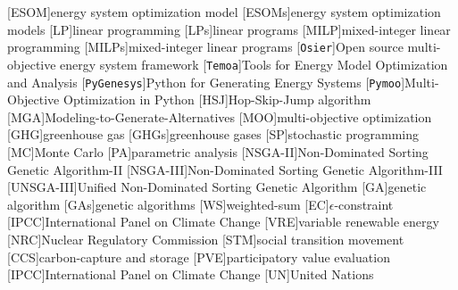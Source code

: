 [ESOM]{energy system optimization model}
[ESOMs]{energy system optimization models}
[LP]{linear programming}
[LPs]{linear programs}
[MILP]{mixed-integer linear programming}
[MILPs]{mixed-integer linear programs}
[\texttt{Osier}]{Open source multi-objective energy system framework}
[\texttt{Temoa}]{Tools for Energy Model Optimization and Analysis}
[\texttt{PyGenesys}]{Python for Generating Energy Systems}
[\texttt{Pymoo}]{Multi-Objective Optimization in Python}
[HSJ]{Hop-Skip-Jump algorithm}
[MGA]{Modeling-to-Generate-Alternatives}
[MOO]{multi-objective optimization}
[GHG]{greenhouse gas}
[GHGs]{greenhouse gases}
[SP]{stochastic programming}
[MC]{Monte Carlo}
[PA]{parametric analysis}
[NSGA-II]{Non-Dominated Sorting Genetic Algorithm-II}
[NSGA-III]{Non-Dominated Sorting Genetic Algorithm-III}
[UNSGA-III]{Unified Non-Dominated Sorting Genetic Algorithm}
[GA]{genetic algorithm}
[GAs]{genetic algorithms}
[WS]{weighted-sum}
[EC]{$\epsilon$-constraint}
[IPCC]{International Panel on Climate Change}
[VRE]{variable renewable energy}
[NRC]{Nuclear Regulatory Commission}
[STM]{social transition movement}
[CCS]{carbon-capture and storage}
[PVE]{participatory value evaluation}
[IPCC]{International Panel on Climate Change}
[UN]{United Nations}